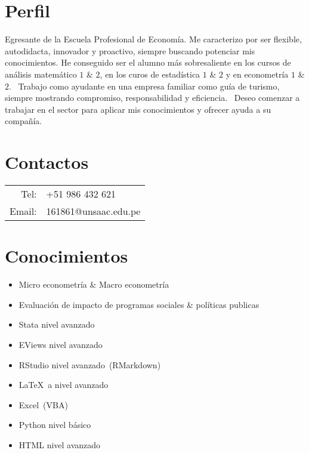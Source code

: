 \documentclass[12pt,oneside,titlepage,a4paper]{article}
\begin{document}
	\begin{tcolorbox}
		\begin{minipage}[t]{8cm}
			\vspace*{-0.5cm}
			\begin{tcolorbox}[grow to left by=0.6cm,colback=gray!125,colframe=white]
				\section*{\footnotesize Perfil}
				Egresante de la Escuela Profesional de Economía. Me caracterizo por ser flexible, autodidacta, innovador y proactivo, siempre buscando potenciar mis conocimientos. He conseguido ser el alumno más sobresaliente en los cursos de análisis matemático $1$ \& $2$, en los curos de estadística $1$ \& $2$ y en econometría $1$ \& $2$. ~Trabajo como ayudante en una empresa familiar como guía de turismo, siempre mostrando compromiso, responsabilidad y eficiencia.~ Deseo comenzar a trabajar en el sector para aplicar mis conocimientos y ofrecer ayuda a su compañía.
				
				\section*{\footnotesize Contactos}
				\begin{tabular}{r l}
					Tel:  & +51 986 432 621 \\
					Email: & 161861@unsaac.edu.pe
				\end{tabular}
				
				\section*{\footnotesize Conocimientos}
				\begin{itemize}
					\item Micro econometría \&  Macro econometría
					\item Evaluación de impacto de programas sociales \& políticas publicas
					\item Stata nivel avanzado
					\item EViews nivel avanzado
					\item RStudio nivel avanzado~(RMarkdown)
					\item \LaTeX~a nivel avanzado
					\item Excel~(VBA)
					\item Python nivel básico
					\item HTML nivel avanzado
				\end{itemize}

\end{tcolorbox}
\end{minipage}
\end{tcolorbox}
\end{document}
